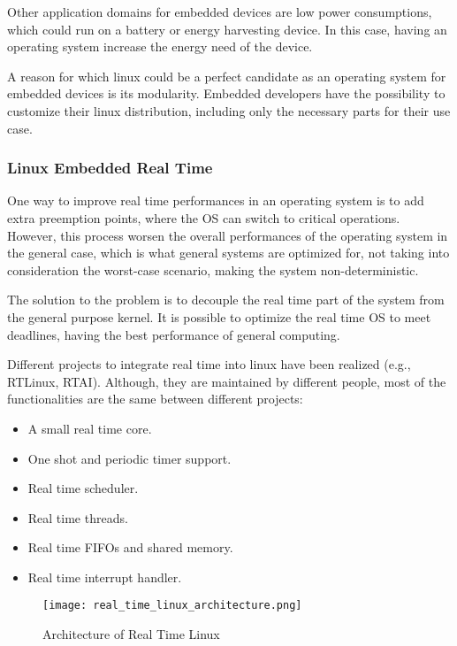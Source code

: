 Other application domains for embedded devices are low power consumptions,
which could run on a battery or energy harvesting device. In this case, having
an operating system increase the energy need of the device.

A reason for which linux could be a perfect candidate as an operating system
for embedded devices is its modularity. Embedded developers have the
possibility to customize their linux distribution, including only the necessary
parts for their use case. \cite{linux_embedded_ubuntu}

\subsubsection{Linux Embedded Real Time}

One way to improve real time performances in an operating system is to add
extra preemption points, where the OS can switch to critical operations.
However, this process worsen the overall performances of the operating system
in the general case, which is what general systems are optimized for, not
taking into consideration the worst-case scenario, making the system
non-deterministic. 

The solution to the problem is to decouple the real time part of the system
from the general purpose kernel.
It is possible to optimize the real time OS to meet deadlines, having the best
performance of general computing. \cite{linux_real_time} 

Different projects to integrate real time into linux have been realized
(e.g., RTLinux, RTAI).
Although, they are maintained by different people, most of the functionalities
are the same between different projects:

\begin{itemize}
    \item A small real time core.
    \item One shot and periodic timer support.
    \item Real time scheduler.
    \item Real time threads.
    \item Real time FIFOs and shared memory.
    \item Real time interrupt handler.
\end{itemize}

\begin{figure}[htb]
    \centering
    \texttt{[image: real\_time\_linux\_architecture.png]}
    \caption{Architecture of Real Time Linux}
    \label{fig:real_time_linux_architecture}
\end{figure}

